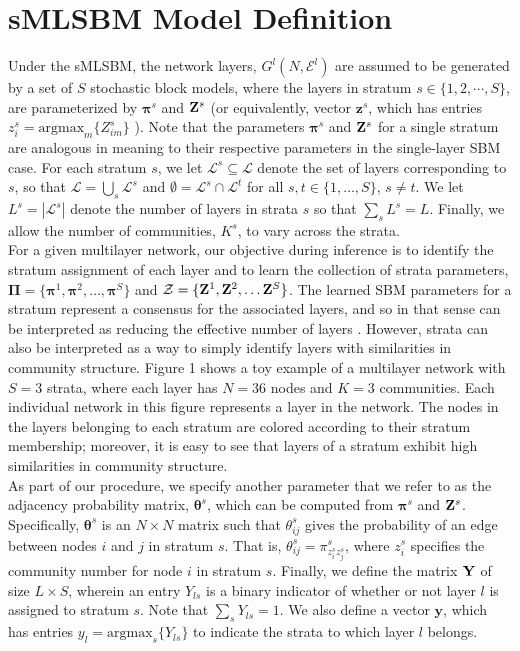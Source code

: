 \section{sMLSBM Model Definition}
\indent Under the sMLSBM, the network layers, $G^{l}(N,\mathcal{E}^{l})$ are assumed to be generated by a set of $S$ stochastic block models, where the layers in stratum $s \in \{1,2,\cdots,S \}$, are parameterized by ${\boldsymbol \pi}^{s}$ and ${\bf Z}^{s}$ (or equivalently, vector ${\boldsymbol z}^s$, which has entries $z^s_{i}=\text{argmax}_m \{Z_{im}^s\}$ ). Note that the parameters ${\boldsymbol \pi}^{s}$ and ${\bf Z}^{s}$ for a single stratum are analogous in meaning to their respective parameters in the single-layer SBM case. 
For each stratum $s$, we let $\mathcal{L}^s\subseteq\mathcal{L}$ denote the set of layers corresponding to $s$, so that $\mathcal{L}=\bigcup_s \mathcal{L}^s$ and $\emptyset=\mathcal{L}^s\cap \mathcal{L}^t$ for all $s,t\in\{1,\dots,S\}$, $s\neq t$. We let $L^s=|\mathcal{L}^s|$ denote the number of layers in strata $s$ so that $\sum_s L^s=L$.
Finally, we allow the number of communities, $K^{s}$, to vary across the strata.
\\\indent
For a given multilayer network, our objective during inference is to identify the stratum assignment of each layer and to learn the collection of strata parameters, $\boldsymbol{\Pi}=\{\boldsymbol{\pi}^{1},\boldsymbol{\pi}^{2},\dots,\boldsymbol{\pi}^{S}\}$ and $\mathcal{Z}=\{{\bf{Z}}^{1},{\bf{Z}}^{2},\dots {\bf{Z}}^{S}\}$. The learned SBM parameters for a stratum represent a consensus for the associated layers, and so in that sense can be interpreted as reducing the effective number of layers \cite{domen}. However, strata can also be interpreted as a way to simply identify layers with similarities in community structure. Figure 1 shows a toy example of a multilayer network with $S=3$ strata, where each layer has $N=36$ nodes and $K=3$ communities. Each individual network in this figure represents a layer in the network. The nodes in the layers belonging to each stratum are colored according to their stratum membership; moreover, it is easy to see that layers of a stratum exhibit high similarities in community structure.  \\
  \indent As part of our procedure, we specify another parameter that we refer to as the adjacency probability matrix, ${\boldsymbol \theta}^{s}$, which can be computed from $\boldsymbol{\pi}^{s}$ and ${\bf{Z}}^{s}$. Specifically, ${\boldsymbol \theta}^{s}$ is an $N \times N$ matrix such that ${\theta}_{ij}^{s}$ gives the probability of an edge between nodes $i$ and $j$ in stratum $s$. That is, ${\theta}_{ij}^{s}={ \pi}^{s}_{z_{i}^{s}z_{j}^{s}}$, where  $z_{i}^{s}$ specifies the community number for node $i$ in stratum $s$. Finally, we define the matrix ${\bf Y}$ of size $L\times S$, wherein an entry $Y_{ls}$ is a binary indicator of whether or not layer $l$ is assigned to stratum $s$. Note that $\sum_{s}Y_{ls}=1$. We also define a vector $\boldsymbol y$, which has entries $y_{l}=\text{argmax}_s \{Y_{ls}\}$ to indicate the strata to which layer $l$ belongs.

